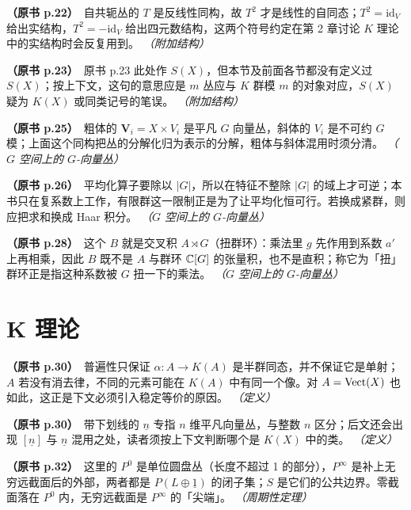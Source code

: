 \noindent \textbf{（原书 p.22）}\ 自共轭丛的 $T$ 是反线性同构，故 $T^2$ 才是线性的自同态；$T^2=\mathrm{id}_V$ 给出实结构，$T^2=-\mathrm{id}_V$ 给出四元数结构，这两个符号约定在第 2 章讨论 $K$ 理论中的实结构时会反复用到。 \textit{（附加结构）}\par\smallskip

\noindent \textbf{（原书 p.23）}\ 原书 p.23 此处作 $S(X)$，但本节及前面各节都没有定义过 $S(X)$；按上下文，这句的意思应是 $m$ 丛应与 $K$ 群模 $m$ 的对象对应，$S(X)$ 疑为 $K(X)$ 或同类记号的笔误。 \textit{（附加结构）}\par\smallskip

\noindent \textbf{（原书 p.25）}\ 粗体的 $\mathbf{V}_i=X\times V_i$ 是平凡 $G$ 向量丛，斜体的 $V_i$ 是不可约 $G$ 模；上面这个同构把丛的分解化归为表示的分解，粗体与斜体混用时须分清。 \textit{（$G$ 空间上的 $G$-向量丛）}\par\smallskip

\noindent \textbf{（原书 p.26）}\ 平均化算子要除以 $|G|$，所以在特征不整除 $|G|$ 的域上才可逆；本书只在复系数上工作，有限群这一限制正是为了让平均化恒可行。若换成紧群，则应把求和换成 Haar 积分。 \textit{（$G$ 空间上的 $G$-向量丛）}\par\smallskip

\noindent \textbf{（原书 p.28）}\ 这个 $B$ 就是交叉积 $A\rtimes G$（扭群环）：乘法里 $g$ 先作用到系数 $a'$ 上再相乘，因此 $B$ 既不是 $A$ 与群环 $\mathbb{C}[G]$ 的张量积，也不是直积；称它为「扭」群环正是指这种系数被 $G$ 扭一下的乘法。 \textit{（$G$ 空间上的 $G$-向量丛）}\par\smallskip

\section*{K 理论}

\noindent \textbf{（原书 p.30）}\ 普遍性只保证 $\alpha\colon A\to K(A)$ 是半群同态，并不保证它是单射；$A$ 若没有消去律，不同的元素可能在 $K(A)$ 中有同一个像。对 $A=\operatorname{Vect}(X)$ 也如此，这正是下文必须引入稳定等价的原因。 \textit{（定义）}\par\smallskip

\noindent \textbf{（原书 p.30）}\ 带下划线的 $\underline{n}$ 专指 $n$ 维平凡向量丛，与整数 $n$ 区分；后文还会出现 $[\underline{n}]$ 与 $\underline{n}$ 混用之处，读者须按上下文判断哪个是 $K(X)$ 中的类。 \textit{（定义）}\par\smallskip

\noindent \textbf{（原书 p.32）}\ 这里的 $P^0$ 是单位圆盘丛（长度不超过 1 的部分），$P^\infty$ 是补上无穷远截面后的外部，两者都是 $P(L\oplus\underline{1})$ 的闭子集；$S$ 是它们的公共边界。零截面落在 $P^0$ 内，无穷远截面是 $P^\infty$ 的「尖端」。 \textit{（周期性定理）}\par\smallskip

